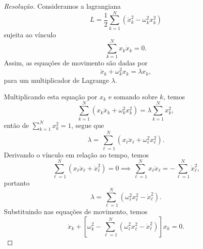 \begin{proof}[Resolução]
    Consideramos a lagrangiana
    \begin{equation*}
        L = \frac12 \sum_{k=1}^N \left(\dot{x}_k^2 - \omega_k^2 x_k^2\right)
    \end{equation*}
    sujeita ao vínculo
    \begin{equation*}
        \sum_{k=1}^N x_k\dot{x}_k = 0.
    \end{equation*}
    Assim, as equações de movimento são dadas por
    \begin{equation*}
        \ddot{x}_k + \omega_k^2x_k = \lambda x_k,
    \end{equation*}
    para um multiplicador de Lagrange \(\lambda\).

    Multiplicando esta equação por \(x_k\) e somando sobre \(k\), temos
    \begin{equation*}
        \sum_{k=1}^N \left(x_k\ddot{x}_k + \omega_k^2x_k^2\right) = \lambda\sum_{k=1}^Nx_k^2,
    \end{equation*}
    então de \(\sum_{k=1}^Nx_k^2 = 1\), segue que
    \begin{equation*}
        \lambda = \sum_{\ell = 1}^N \left(x_\ell\ddot{x}_\ell + \omega_\ell^2x_\ell^2\right).
    \end{equation*}
    Derivando o vínculo em relação ao tempo, temos
    \begin{equation*}
        \sum_{\ell=1}^N \left(x_\ell\ddot{x}_\ell + \dot{x}_\ell^2\right) = 0 \implies \sum_{\ell=1}^N x_\ell \ddot{x}_\ell = - \sum_{\ell=1}^N \dot{x}_\ell^2,
    \end{equation*}
    portanto
    \begin{equation*}
        \lambda = \sum_{\ell=1}^N \left(\omega_\ell^2 x_\ell^2 - \dot{x}_\ell^2\right).
    \end{equation*}
    Substituindo nas equações de movimento, temos
    \begin{equation*}
        \ddot{x}_k + \left[\omega_k^2 - \sum_{\ell=1}^N \left(\omega_\ell^2 x_\ell^2 - \dot{x}_\ell^2\right)\right]x_k = 0.
    \end{equation*}


\end{proof}
